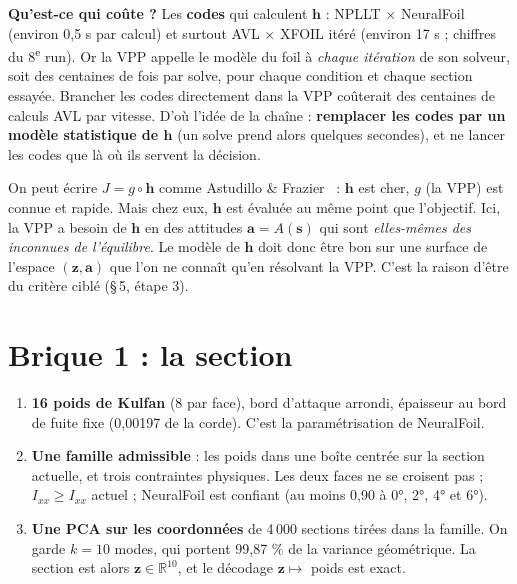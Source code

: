 \documentclass[11pt,a4paper]{article}
\newcommand{\vz}{\bm{z}}
\newcommand{\va}{\bm{a}}
\newcommand{\vs}{\bm{s}}
\newcommand{\vh}{\bm{h}}
\begin{document}
\textbf{Qu'est-ce qui coûte ?} Les \textbf{codes} qui calculent $\vh$ : NPLLT × NeuralFoil (environ 0,5 s
par calcul) et surtout AVL × XFOIL itéré (environ 17 s ; chiffres du 8\textsuperscript{e} run). Or la VPP
appelle le modèle du foil à \emph{chaque itération} de son solveur, soit des centaines de fois par solve, pour
chaque condition et chaque section essayée. Brancher les codes directement dans la VPP coûterait des centaines
de calculs AVL par vitesse. D'où l'idée de la chaîne : \textbf{remplacer les codes par un modèle statistique de
$\vh$} (un solve prend alors quelques secondes), et ne lancer les codes que là où ils servent la décision.

\begin{subtilite}[pourquoi ce n'est pas une simple composition $f=g\circ h$]
On peut écrire $J=g\circ\vh$ comme Astudillo \& Frazier~\cite{AF19} : $\vh$ est cher, $g$ (la VPP) est connue
et rapide. Mais chez eux, $\vh$ est évaluée au même point que l'objectif. Ici, la VPP a besoin de $\vh$ en des
attitudes $\va=A(\vs)$ qui sont \emph{elles-mêmes des inconnues de l'équilibre}. Le modèle de $\vh$ doit donc
être bon sur une surface de l'espace $(\vz,\va)$ que l'on ne connaît qu'en résolvant la VPP. C'est la raison
d'être du critère ciblé (§\,5, étape 3).
\end{subtilite}

\section{Brique 1 : la section}
\begin{enumerate}
  \item \textbf{16 poids de Kulfan} (8 par face), bord d'attaque arrondi, épaisseur au bord de fuite fixe
        (0,00197 de la corde). C'est la paramétrisation de NeuralFoil.
  \item \textbf{Une famille admissible} : les poids dans une boîte centrée sur la section actuelle, et trois
        contraintes physiques. Les deux faces ne se croisent pas ; $I_{xx}\ge I_{xx}$ actuel ; NeuralFoil
        est confiant (au moins 0,90 à 0°, 2°, 4° et 6°).
  \item \textbf{Une PCA sur les coordonnées} de 4\,000 sections tirées dans la famille. On garde $k=10$
        modes, qui portent 99,87 \% de la variance géométrique. La section est alors $\vz\in\mathbb R^{10}$, et
        le décodage $\vz\mapsto$ poids est exact.
\end{enumerate}
\end{document}
